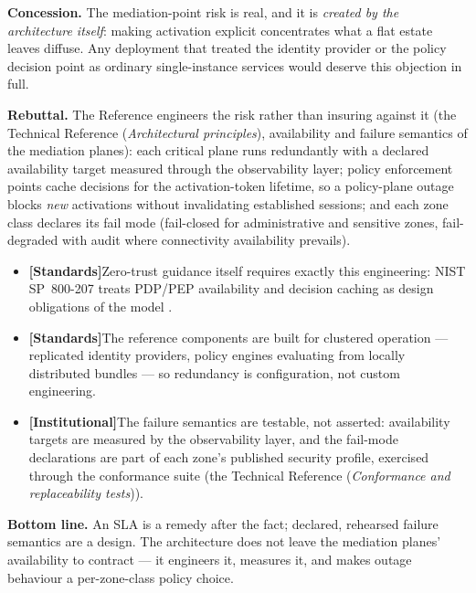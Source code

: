 \documentclass[11pt,a4paper,twoside]{book}
\let\citep\parencite
\newcommand{\evstd}{\textcolor{NavyBlue}{\textbf{[Standards]}}\space}
\newcommand{\evinst}{\textcolor{Slate}{\textbf{[Institutional]}}\space}
\newcommand{\trref}[1]{the Technical Reference (\emph{#1})}
\begin{document}
\begin{answerbox}[Response O1.2]
\textbf{Concession.} The mediation-point risk is real, and it is
\emph{created by the architecture itself}: making activation
explicit concentrates what a flat estate leaves diffuse. Any
deployment that treated the identity provider or the policy
decision point as ordinary single-instance services would deserve
this objection in full.

\medskip
\textbf{Rebuttal.} The Reference engineers the risk rather than
insuring against it (\trref{Architectural principles}, availability
and failure semantics of the mediation planes): each critical plane
runs redundantly with a declared availability target measured
through the observability layer; policy enforcement points cache
decisions for the activation-token lifetime, so a policy-plane
outage blocks \emph{new} activations without invalidating
established sessions; and each zone class declares its fail mode
(fail-closed for administrative and sensitive zones, fail-degraded
with audit where connectivity availability prevails).

\begin{itemize}[leftmargin=1.4em,itemsep=2pt]
  \item \evstd Zero-trust guidance itself requires exactly this
        engineering: NIST SP~800-207 treats PDP/PEP availability
        and decision caching as design obligations of the model
        \citep{nist-zt}.
  \item \evstd The reference components are built for clustered
        operation --- replicated identity providers, policy engines
        evaluating from locally distributed bundles
        \citep{opa-project} --- so redundancy is configuration, not
        custom engineering.
  \item \evinst The failure semantics are testable, not asserted:
        availability targets are measured by the observability
        layer, and the fail-mode declarations are part of each
        zone's published security profile, exercised through the
        conformance suite (\trref{Conformance and replaceability
        tests}).
\end{itemize}

\textbf{Bottom line.} An SLA is a remedy after the fact; declared,
rehearsed failure semantics are a design. The architecture does not
leave the mediation planes' availability to contract --- it
engineers it, measures it, and makes outage behaviour a
per-zone-class policy choice.
\end{answerbox}
\end{document}
